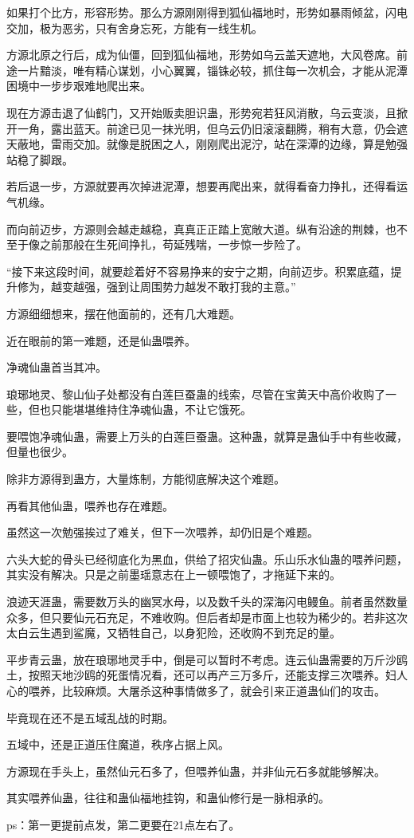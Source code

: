 \begin{this_body}
如果打个比方，形容形势。那么方源刚刚得到狐仙福地时，形势如暴雨倾盆，闪电交加，极为恶劣，只有舍身忘死，方能有一线生机。

方源北原之行后，成为仙僵，回到狐仙福地，形势如乌云盖天遮地，大风卷席。前途一片黯淡，唯有精心谋划，小心翼翼，锱铢必较，抓住每一次机会，才能从泥潭困境中一步步艰难地爬出来。

现在方源击退了仙鹤门，又开始贩卖胆识蛊，形势宛若狂风消散，乌云变淡，且掀开一角，露出蓝天。前途已见一抹光明，但乌云仍旧滚滚翻腾，稍有大意，仍会遮天蔽地，雷雨交加。就像是脱困之人，刚刚爬出泥泞，站在深潭的边缘，算是勉强站稳了脚跟。

若后退一步，方源就要再次掉进泥潭，想要再爬出来，就得看奋力挣扎，还得看运气机缘。

而向前迈步，方源则会越走越稳，真真正正踏上宽敞大道。纵有沿途的荆棘，也不至于像之前那般在生死间挣扎，苟延残喘，一步惊一步险了。

“接下来这段时间，就要趁着好不容易挣来的安宁之期，向前迈步。积累底蕴，提升修为，越变越强，强到让周围势力越发不敢打我的主意。”

方源细细想来，摆在他面前的，还有几大难题。

近在眼前的第一难题，还是仙蛊喂养。

净魂仙蛊首当其冲。

琅琊地灵、黎山仙子处都没有白莲巨蚕蛊的线索，尽管在宝黄天中高价收购了一些，但也只能堪堪维持住净魂仙蛊，不让它饿死。

要喂饱净魂仙蛊，需要上万头的白莲巨蚕蛊。这种蛊，就算是蛊仙手中有些收藏，但量也很少。

除非方源得到蛊方，大量炼制，方能彻底解决这个难题。

再看其他仙蛊，喂养也存在难题。

虽然这一次勉强挨过了难关，但下一次喂养，却仍旧是个难题。

六头大蛇的骨头已经彻底化为黑血，供给了招灾仙蛊。乐山乐水仙蛊的喂养问题，其实没有解决。只是之前墨瑶意志在上一顿喂饱了，才拖延下来的。

浪迹天涯蛊，需要数万头的幽冥水母，以及数千头的深海闪电鳗鱼。前者虽然数量众多，但只要仙元石充足，不难收购。但后者却是市面上也较为稀少的。若非这次太白云生遇到鲨魔，又牺牲自己，以身犯险，还收购不到充足的量。

平步青云蛊，放在琅琊地灵手中，倒是可以暂时不考虑。连云仙蛊需要的万斤沙鸥土，按照天地沙鸥的死蛋情况看，还可以再产三万多斤，还能支撑三次喂养。妇人心的喂养，比较麻烦。大屠杀这种事情做多了，就会引来正道蛊仙们的攻击。

毕竟现在还不是五域乱战的时期。

五域中，还是正道压住魔道，秩序占据上风。

方源现在手头上，虽然仙元石多了，但喂养仙蛊，并非仙元石多就能够解决。

其实喂养仙蛊，往往和蛊仙福地挂钩，和蛊仙修行是一脉相承的。

ps：第一更提前点发，第二更要在21点左右了。

\end{this_body}

